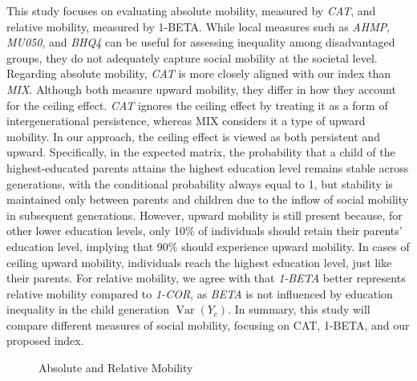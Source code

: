 This study focuses on evaluating absolute mobility, measured by \textit{CAT}, and relative mobility, measured by 1-BETA. While local measures such as \textit{AHMP}, \textit{MU050}, and \textit{BHQ4} can be useful for assessing inequality among disadvantaged groups, they do not adequately capture social mobility at the societal level. Regarding absolute mobility, \textit{CAT} is more closely aligned with our index than \textit{MIX}. Although both measure upward mobility, they differ in how they account for the ceiling effect. \textit{CAT} ignores the ceiling effect by treating it as a form of intergenerational persistence, whereas MIX considers it a type of upward mobility. In our approach, the ceiling effect is viewed as both persistent and upward. Specifically, in the expected matrix, the probability that a child of the highest-educated parents attains the highest education level remains stable across generations, with the conditional probability always equal to 1, but stability is maintained only between parents and children due to the inflow of social mobility in subsequent generations. However, upward mobility is still present because, for other lower education levels, only 10\% of individuals should retain their parents' education level, implying that 90\% should experience upward mobility. In cases of ceiling upward mobility, individuals reach the highest education level, just like their parents. For relative mobility, we agree with \citet{van2024intergenerational} that \textit{1-BETA} better represents relative mobility compared to \textit{1-COR}, as \textit{BETA} is not influenced by education inequality in the child generation $\operatorname{Var}(Y_c)$. In summary, this study will compare different measures of social mobility, focusing on CAT, 1-BETA, and our proposed index.

\begin{figure}[H]
    \centering
    \scalebox{0.5}{}
    \caption{Absolute and Relative Mobility}
    \label{fig:abs_rel}
\end{figure}

